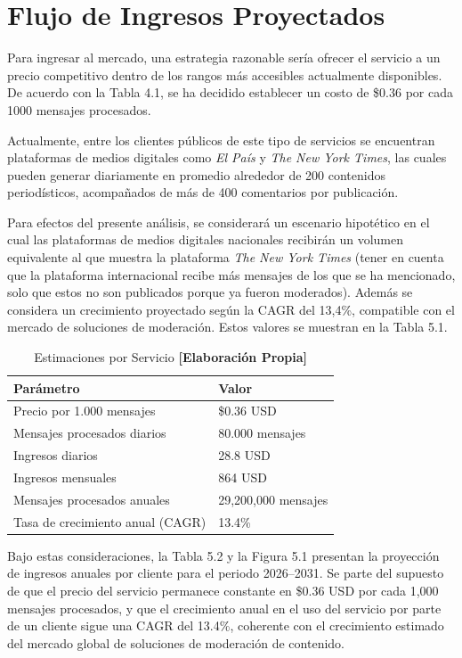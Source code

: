 \chapter{Flujo de Ingresos Proyectados}

Para ingresar al mercado, una estrategia razonable sería ofrecer el servicio a un precio competitivo dentro de los rangos más accesibles actualmente disponibles. De acuerdo con la Tabla 4.1, se ha decidido establecer un costo de \$0.36 por cada 1000 mensajes procesados.

Actualmente, entre los clientes públicos de este tipo de servicios se encuentran plataformas de medios digitales como \textit{El País} y \textit{The New York Times}, las cuales pueden generar diariamente en promedio alrededor de 200 contenidos periodísticos, acompañados de más de 400 comentarios por publicación.

Para efectos del presente análisis, se considerará un escenario hipotético en el cual las plataformas de medios digitales nacionales recibirán un volumen equivalente al que muestra la plataforma \textit{The New York Times} (tener en cuenta que la plataforma internacional recibe más mensajes de los que se ha mencionado, solo que estos no son publicados porque ya fueron moderados). Además se considera un crecimiento proyectado según la CAGR del 13,4\%, compatible con el mercado de soluciones de moderación. Estos valores se muestran en la Tabla 5.1.

\begin{table}[h!]
    \centering
    \begin{tabular}{l l}
        \hline
        \textbf{Parámetro} & \textbf{Valor} \\
        \hline
        Precio por 1.000 mensajes & \$0.36 USD \\
        Mensajes procesados diarios & 80.000 mensajes \\
        Ingresos diarios & 28.8 USD \\
        Ingresos mensuales & 864 USD \\
        Mensajes procesados anuales & 29,200,000 mensajes \\
        Tasa de crecimiento anual (CAGR) & 13.4\% \\
        \hline
    \end{tabular}
    \caption{Estimaciones por Servicio \textbf{[Elaboración Propia]}}
\end{table}

Bajo estas consideraciones, la Tabla 5.2 y la Figura 5.1 presentan la proyección de ingresos anuales por cliente para el periodo 2026--2031. Se parte del supuesto de que el precio del servicio permanece constante en \$0.36 USD por cada 1,000 mensajes procesados, y que el crecimiento anual en el uso del servicio por parte de un cliente sigue una CAGR del 13.4\%, coherente con el crecimiento estimado del mercado global de soluciones de moderación de contenido.









